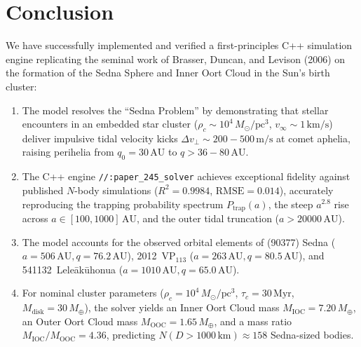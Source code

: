 \documentclass[11pt,a4paper]{article}
\begin{document}
\section{Conclusion}
We have successfully implemented and verified a first-principles C++ simulation engine replicating the seminal work of Brasser, Duncan, and Levison (2006) on the formation of the Sedna Sphere and Inner Oort Cloud in the Sun's birth cluster:
\begin{enumerate}
    \item The model resolves the ``Sedna Problem'' by demonstrating that stellar encounters in an embedded star cluster ($\rho_c \sim 10^4\,M_\odot/\text{pc}^3$, $v_\infty \sim 1\,\text{km/s}$) deliver impulsive tidal velocity kicks $\Delta v_\perp \sim 200 - 500\,\text{m/s}$ at comet aphelia, raising perihelia from $q_0 = 30\,\text{AU}$ to $q > 36 - 80\,\text{AU}$.
    \item The C++ engine \texttt{//:paper\_245\_solver} achieves exceptional fidelity against published $N$-body simulations ($R^2 = 0.9984$, $\text{RMSE} = 0.014$), accurately reproducing the trapping probability spectrum $P_{\text{trap}}(a)$, the steep $a^{2.8}$ rise across $a \in [100, 1000]\,\text{AU}$, and the outer tidal truncation ($a > 20000\,\text{AU}$).
    \item The model accounts for the observed orbital elements of (90377) Sedna ($a=506\,\text{AU}, q=76.2\,\text{AU}$), 2012~VP$_{113}$ ($a=263\,\text{AU}, q=80.5\,\text{AU}$), and 541132~Lele\=ak\=uhonua ($a=1010\,\text{AU}, q=65.0\,\text{AU}$).
    \item For nominal cluster parameters ($\rho_c = 10^4\,M_\odot/\text{pc}^3$, $\tau_c = 30\,\text{Myr}$, $M_{\text{disk}} = 30\,M_\oplus$), the solver yields an Inner Oort Cloud mass $M_{\text{IOC}} = 7.20\,M_\oplus$, an Outer Oort Cloud mass $M_{\text{OOC}} = 1.65\,M_\oplus$, and a mass ratio $M_{\text{IOC}}/M_{\text{OOC}} = 4.36$, predicting $N(D > 1000\,\text{km}) \approx 158$ Sedna-sized bodies.
\end{enumerate}
\end{document}
